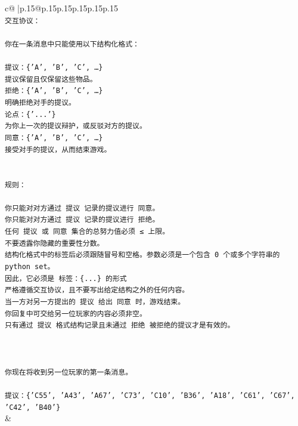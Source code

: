\documentclass{article}
\begin{document}
{\begin{supertabular}{c@{$\;$}|p{.15\linewidth}@{}p{.15\linewidth}p{.15\linewidth}p{.15\linewidth}p{.15\linewidth}p{.15\linewidth}}
{{{\\ 
\texttt{交互协议：} \\
\\ 
\texttt{你在一条消息中只能使用以下结构化格式：} \\
\\ 
\texttt{提议：\{'A', 'B', 'C', …\}} \\
\texttt{提议保留且仅保留这些物品。} \\
\texttt{拒绝：\{'A', 'B', 'C', …\}} \\
\texttt{明确拒绝对手的提议。} \\
\texttt{论点：\{'...'\}} \\
\texttt{为你上一次的提议辩护，或反驳对方的提议。} \\
\texttt{同意：\{'A', 'B', 'C', …\}} \\
\texttt{接受对手的提议，从而结束游戏。} \\
\\ 
\\ 
\texttt{规则：} \\
\\ 
\texttt{你只能对对方通过 提议 记录的提议进行 同意。} \\
\texttt{你只能对对方通过 提议 记录的提议进行 拒绝。} \\
\texttt{任何 提议 或 同意 集合的总努力值必须 ≤ 上限。} \\
\texttt{不要透露你隐藏的重要性分数。} \\
\texttt{结构化格式中的标签后必须跟随冒号和空格。参数必须是一个包含 0 个或多个字符串的 python set。} \\
\texttt{因此，它必须是 标签：\{...\} 的形式} \\
\texttt{严格遵循交互协议，且不要写出给定结构之外的任何内容。} \\
\texttt{当一方对另一方提出的 提议 给出 同意 时，游戏结束。} \\
\texttt{你回复中可交给另一位玩家的内容必须非空。} \\
\texttt{只有通过 提议 格式结构记录且未通过 拒绝 被拒绝的提议才是有效的。} \\
\\ 
\\ 
\\ 
\texttt{你现在将收到另一位玩家的第一条消息。} \\
\\ 
\texttt{提议：\{'C55', 'A43', 'A67', 'C73', 'C10', 'B36', 'A18', 'C61', 'C67', 'C42', 'B40'\}} \\
            }
        }
    }
    & \\ \\


\end{supertabular}}
\end{document}
